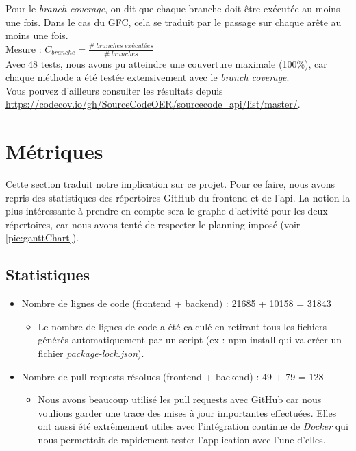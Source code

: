 Pour le \textit{branch coverage}, on dit que chaque branche doit être exécutée au moins une fois. Dans le cas du GFC, cela se traduit par le passage sur chaque arête au moins une fois.\\

Mesure : $ C_{branche} =  \frac{\# \; branches \; exécutées}{\# \; branches}  $\\

Avec 48 tests, nous avons pu atteindre une couverture maximale (100\%), car chaque méthode a été testée extensivement avec le \textit{branch coverage}.\\

Vous pouvez d'ailleurs consulter les résultats depuis \url{https://codecov.io/gh/SourceCodeOER/sourcecode_api/list/master/}.



\section{Métriques}

Cette section traduit notre implication sur ce projet. Pour ce faire, nous avons repris des statistiques des répertoires GitHub du \gls{frontend} et de l'\gls{api}. La notion la plus intéressante à prendre en compte sera le graphe d'activité pour les deux répertoires, car nous avons tenté de respecter le planning imposé (voir \ref{pic:ganttChart}).

\subsection{Statistiques}

\begin{itemize}
    \item Nombre de lignes de code (frontend + backend) : 21685 + 10158 = 31843
    \begin{itemize}
        \item Le nombre de lignes de code a été calculé en retirant tous les fichiers générés automatiquement par un script (ex : npm install qui va créer un fichier \textit{package-lock.json}).
    \end{itemize}
    \item Nombre de pull requests résolues (frontend + backend) : 49 + 79 = 128
    \begin{itemize}
        \item Nous avons beaucoup utilisé les pull requests avec GitHub car nous voulions garder une trace des mises à jour importantes effectuées. Elles ont aussi été extrêmement utiles avec l'intégration continue de \textit{Docker} qui nous permettait de rapidement tester l'application avec l'une d'elles.
    \end{itemize}
\end{itemize}

